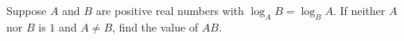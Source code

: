 Suppose $A$ and $B$ are positive real numbers with $\log_AB=\log_BA$. If neither $A$ nor $B$ is $1$ and $A\ne B$, find the value of $AB$.
